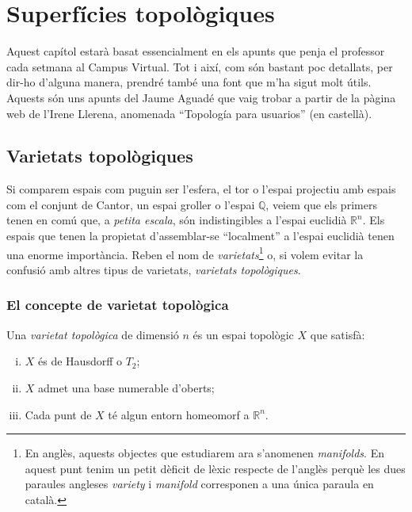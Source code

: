 \documentclass[../main.tex]{subfiles}
\begin{document}
\chapter{Superfícies topològiques}

Aquest capítol estarà basat essencialment en els apunts que penja el professor cada setmana al Campus Virtual. Tot i així, com són bastant poc detallats, per dir-ho d'alguna manera, prendré també una font que m'ha sigut molt útils. Aquests són uns apunts del Jaume Aguadé \cite{aguade} que vaig trobar a partir de la pàgina web de l'Irene Llerena, anomenada ``Topología para usuarios'' \cite{topologiaparausuarios} (en castellà).

\section{Varietats topològiques}

Si comparem espais com puguin ser l'esfera, el tor o l'espai projectiu amb espais com el conjunt de Cantor, un espai groller o l'espai $\mathbb{Q}$, veiem que els primers tenen en comú que, a \textit{petita escala}, són indistingibles a l'espai euclidià $\mathbb{R}^n$. Els espais que tenen la propietat d'assemblar-se ``localment'' a l'espai euclidià tenen una enorme importància. Reben el nom de \textit{varietats}\footnote{En anglès, aquests objectes que estudiarem ara s'anomenen \textit{manifolds}. En aquest punt tenim un petit dèficit de lèxic respecte de l'anglès perquè les dues paraules angleses \textit{variety} i \textit{manifold} corresponen a una única paraula en català.} o, si volem evitar la confusió amb altres tipus de varietats, \textit{varietats topològiques}.

\subsection{El concepte de varietat topològica}

\begin{defi}
\label{def:varietattopologica} Una \textit{varietat topològica} de dimensió $n$ és un espai topològic $X$ que satisfà:
\begin{enumerate}[(i)]
    \item $X$ és de Hausdorff o $T_2$;
    \item $X$ admet una base numerable d'oberts;
    \item Cada punt de $X$ té algun entorn homeomorf a $\mathbb{R}^n$.
\end{enumerate}
\end{defi}
\end{document}
